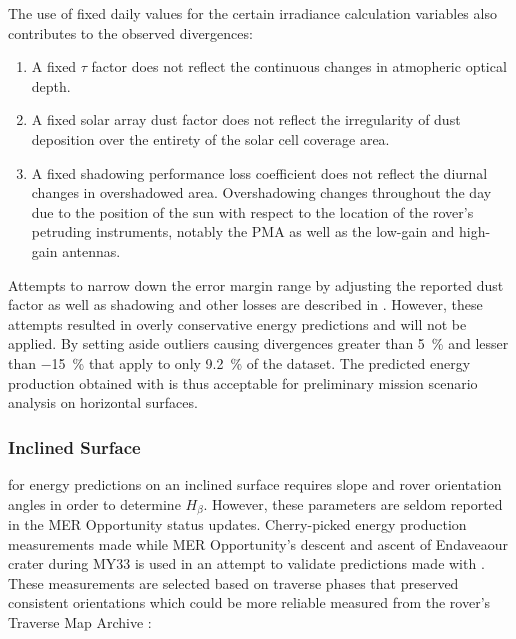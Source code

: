 \vspace{0.5cm}



\vspace{0.5cm}

The use of fixed daily values for the certain irradiance calculation variables also contributes to the observed divergences:
\clearpage
\begin{enumerate}[label=\textcolor{BulletBlue}{(\alph*)}]
  \item A fixed $\tau$ factor does not reflect the continuous changes in atmopheric optical depth.
  \item A fixed solar array dust factor does not reflect the irregularity of dust deposition over the entirety of the solar cell coverage area.
  \item A fixed shadowing performance loss coefficient does not reflect the diurnal changes in overshadowed area. Overshadowing changes throughout the day due to the position of the sun with respect to the location of the rover's petruding instruments, notably the \ac{PMA} as well as the low-gain and high-gain antennas.
\end{enumerate}

Attempts to narrow down the error margin range by adjusting the reported dust factor as well as shadowing and other losses are described in . However, these attempts resulted in overly conservative energy predictions and will not be applied. By setting aside outliers causing divergences greater than \SI{5}{\percent} and lesser than \SI{-15}{\percent} that apply to only \SI{9.2}{\percent} of the dataset. The predicted energy production obtained with  is thus acceptable for preliminary mission scenario analysis on horizontal surfaces.

\subsubsection{Inclined Surface}
\label{sec:PowerAndEnergyPredictions:Validation:InclinedSurface}

 for energy predictions on an inclined surface requires slope and rover orientation angles in order to determine $H_{\beta}$. However, these parameters are seldom reported in the \ac{MER} Opportunity status updates. Cherry-picked energy production measurements made while \ac{MER} Opportunity's descent and ascent of Endaveaour crater during \ac{MY}33 is used in an attempt to validate predictions made with . These measurements are selected based on traverse phases that preserved consistent orientations which could be more reliable measured from the rover's Traverse Map Archive :

